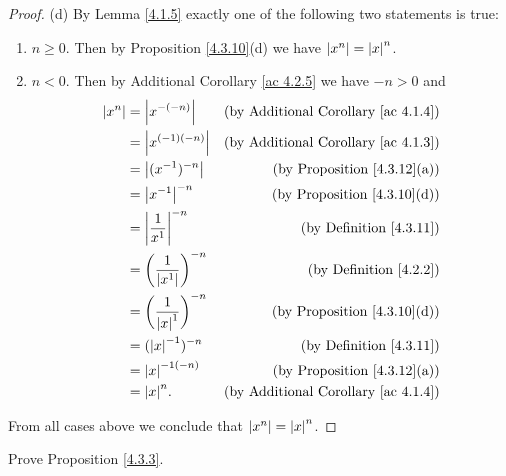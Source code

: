 \begin{proof}{(d)}
    By Lemma \ref{4.1.5} exactly one of the following two statements is true:
    \begin{enumerate}[label=(\Roman*)]
        \item \(n \geq 0\).
              Then by Proposition \ref{4.3.10}(d) we have \(\abs*{x^n} = \abs*{x}^n\).
        \item \(n < 0\).
              Then by Additional Corollary \ref{ac 4.2.5} we have \(-n > 0\) and
              \begin{align*}
                  \abs*{x^n} & = \abs*{x^{-(-n)}}                      & \text{(by Additional Corollary \ref{ac 4.1.4})} \\
                             & = \abs*{x^{(-1)(-n)}}                   & \text{(by Additional Corollary \ref{ac 4.1.3})} \\
                             & = \abs*{(x^{-1})^{-n}}                  & \text{(by Proposition \ref{4.3.12}(a))}         \\
                             & = \abs*{x^{-1}}^{-n}                    & \text{(by Proposition \ref{4.3.10}(d))}         \\
                             & = \abs*{\frac{1}{x^1}}^{-n}             & \text{(by Definition \ref{4.3.11})}             \\
                             & = \bigg(\frac{1}{\abs*{x^1}}\bigg)^{-n} & \text{(by Definition \ref{4.2.2})}              \\
                             & = \bigg(\frac{1}{\abs*{x}^1}\bigg)^{-n} & \text{(by Proposition \ref{4.3.10}(d))}         \\
                             & = (\abs*{x}^{-1})^{-n}                  & \text{(by Definition \ref{4.3.11})}             \\
                             & = \abs*{x}^{-1(-n)}                     & \text{(by Proposition \ref{4.3.12}(a))}         \\
                             & = \abs*{x}^n.                           & \text{(by Additional Corollary \ref{ac 4.1.4})}
              \end{align*}
    \end{enumerate}
    From all cases above we conclude that \(\abs*{x^n} = \abs*{x}^n\).
\end{proof}

\exercisesection

\begin{exercise}\label{ex 4.3.1}
    Prove Proposition \ref{4.3.3}.
\end{exercise}

